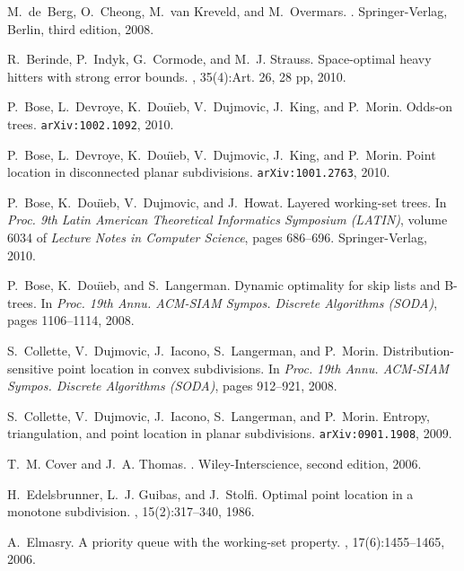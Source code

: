 \documentclass[11pt]{article}
\begin{document}
\begin{thebibliography}{10}
M.~{}de~Berg, O.~Cheong, M.~van Kreveld, and M.~Overmars.
.
\newblock Springer-Verlag, Berlin, third edition, 2008.

R.~Berinde, P.~Indyk, G.~Cormode, and M.~J. Strauss.
\newblock Space-optimal heavy hitters with strong error bounds.
, 35(4):Art. 26, 28 pp, 2010.

P.~Bose, L.~Devroye, K.~Dou\"{\i}eb, V.~Dujmovic, J.~King, and P.~Morin.
\newblock Odds-on trees.
\newblock \texttt{arXiv:1002.1092}, 2010.

P.~Bose, L.~Devroye, K.~Dou\"{\i}eb, V.~Dujmovic, J.~King, and P.~Morin.
\newblock Point location in disconnected planar subdivisions.
\newblock \texttt{arXiv:1001.2763}, 2010.

P.~Bose, K.~Dou\"{\i}eb, V.~Dujmovic, and J.~Howat.
\newblock Layered working-set trees.
\newblock In {\em Proc. 9th Latin American Theoretical Informatics Symposium
  (LATIN)}, volume 6034 of {\em Lecture Notes in Computer Science}, pages
  686--696. Springer-Verlag, 2010.

P.~Bose, K.~Dou\"{\i}eb, and S.~Langerman.
\newblock Dynamic optimality for skip lists and {B}-trees.
\newblock In {\em Proc. 19th Annu. ACM-SIAM Sympos. Discrete Algorithms
  (SODA)}, pages 1106--1114, 2008.

S.~Collette, V.~Dujmovic, J.~Iacono, S.~Langerman, and P.~Morin.
\newblock Distribution-sensitive point location in convex subdivisions.
\newblock In {\em Proc. 19th Annu. ACM-SIAM Sympos. Discrete Algorithms
  (SODA)}, pages 912--921, 2008.

S.~Collette, V.~Dujmovic, J.~Iacono, S.~Langerman, and P.~Morin.
\newblock Entropy, triangulation, and point location in planar subdivisions.
\newblock \texttt{arXiv:0901.1908}, 2009.

T.~M. Cover and J.~A. Thomas.
.
\newblock Wiley-Interscience, second edition, 2006.

H.~Edelsbrunner, L.~J. Guibas, and J.~Stolfi.
\newblock Optimal point location in a monotone subdivision.
, 15(2):317--340, 1986.

A.~Elmasry.
\newblock A priority queue with the working-set property.
, 17(6):1455--1465, 2006.


\end{thebibliography}
\end{document}
